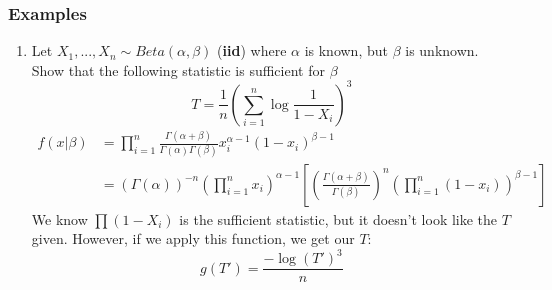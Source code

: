 \documentclass{article}
\begin{document}
\subsubsection{Examples}
\begin{enumerate}
    \item Let $X_1,...,X_n\sim Beta(\alpha,\beta)$ (\textbf{iid}) where $\alpha$ is known, but $\beta$ is unknown. Show that the following statistic is sufficient for $\beta$
    \begin{equation*}
        T = \frac{1}{n}\left(\sum_{i=1}^n \log \frac{1}{1-X_i} \right)^3
    \end{equation*}
    \begin{equation*}
        \begin{split}
            f(x|\beta) &= \prod_{i=1}^n \frac{\Gamma(\alpha + \beta)}{\Gamma(\alpha)\Gamma(\beta)} x_i^{\alpha-1}(1-x_i)^{\beta-1}\\
            &= \left(\Gamma(\alpha)\right)^{-n} \left( \prod_{i=1}^n x_i\right)^{\alpha-1} \left[\left(\frac{\Gamma(\alpha + \beta)}{\Gamma(\beta)}\right)^n \left(\prod_{i=1}^n (1-x_i) \right)^{\beta-1} \right]
        \end{split}
    \end{equation*}
    We know $\prod (1-X_i)$ is the sufficient statistic, but it doesn't look like the $T$ given. However, if we apply this function, we get our $T$:
    \begin{equation*}
        g(T') = \frac{-\log (T')^3 }{n}
    \end{equation*}
\end{enumerate}
\end{document}
